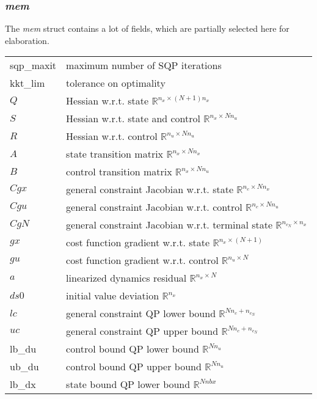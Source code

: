 \documentclass{article}
\newcommand{\alert}[1]{{\textit{#1}}}
\begin{document}
\subsubsection{\alert{mem}}
The \alert{mem} struct contains a lot of fields, which are partially selected here for elaboration.
\begin{longtable}{l|l}
		\hline
		sqp\_maxit & maximum number of SQP iterations          \\
		kkt\_lim   & tolerance on optimality                   \\ \hline
	    $Q$	& Hessian w.r.t. state  $\mathbb{R}^{n_x\times (N+1)n_x}$                    \\
		$S$	& Hessian w.r.t. state and control $\mathbb{R}^{n_x\times Nn_u}$             \\
		$R$	& Hessian w.r.t. control   $\mathbb{R}^{n_u\times Nn_u}$                 \\
		$A$	& state transition matrix  $\mathbb{R}^{n_x\times Nn_x}$                 \\
		$B$	& control transition matrix  $\mathbb{R}^{n_x\times Nn_u}$               \\
		$Cgx$	& general constraint Jacobian w.r.t. state $\mathbb{R}^{n_c\times Nn_x}$         \\
		$Cgu$	& general constraint Jacobian w.r.t. control $\mathbb{R}^{n_c\times Nn_u}$       \\
		$CgN$	& general constraint Jacobian w.r.t. terminal state $\mathbb{R}^{n_{c_N}\times n_x}$ \\
		$gx$	& cost function gradient w.r.t. state $\mathbb{R}^{n_x\times (N+1)}$      \\
		$gu$	& cost function gradient w.r.t. control $\mathbb{R}^{n_u\times N}$    \\
		$a$	& linearized dynamics residual  $\mathbb{R}^{n_x\times N}$            \\
		$ds0$	& initial value deviation   $\mathbb{R}^{n_x}$                \\
		$lc$	& general constraint QP lower bound $\mathbb{R}^{Nn_c+n_{c_N}}$         \\
		$uc$	& general constraint QP upper bound $\mathbb{R}^{Nn_c+n_{c_N}}$         \\
	    lb\_du	& control bound QP lower bound    $\mathbb{R}^{Nn_u}$           \\
		ub\_du	& control bound QP upper bound    $\mathbb{R}^{Nn_u}$           \\
		lb\_dx	& state bound QP lower bound    $\mathbb{R}^{Nnbx}$            \\

\end{longtable}
\end{document}
